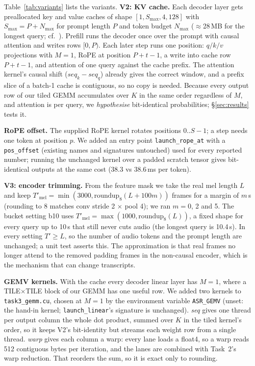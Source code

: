 \documentclass{article}
\begin{document}
Table~\ref{tab:variants} lists the variants.
\textbf{V2: KV cache.} Each decoder layer gets preallocated key and value caches of
shape $[1, S_{\max}, 4, 128]$ with $S_{\max} = P + N_{\max}$ for prompt length $P$
and token budget $N_{\max}$ ($\approx$28\,MB for the longest query;
cf.\ \citealp{kwon2023pagedattention,pope2023efficiently}). Prefill runs the decoder
once over the prompt with causal attention and writes rows $[0, P)$. Each later step
runs one position: $q/k/v$ projections with $M=1$, RoPE at position $P+t-1$, a write
into cache row $P+t-1$, and attention of one query against the cache prefix. The
attention kernel's causal shift ($\mathit{seq}_k - \mathit{seq}_q$) already gives the
correct window, and a prefix slice of a batch-1 cache is contiguous, so no copy is
needed. Because every
output row of our tiled GEMM accumulates over $K$ in the same order regardless of
$M$, and attention is per query, we \emph{hypothesise} bit-identical probabilities;
\S\ref{sec:results} tests it.

\textbf{RoPE offset.} The supplied RoPE kernel rotates positions $0..S-1$; a step needs
one token at position $p$. We added an entry point \texttt{launch\_rope\_at} with a
\texttt{pos\_offset} (existing names and signatures untouched) used for every reported number; running the unchanged kernel over a padded scratch
tensor gives bit-identical outputs at the same cost (38.3 vs 38.6\,ms per token).

\textbf{V3: encoder trimming.} From the feature mask we take the real mel length
$L$ and keep $T'_{\mathrm{mel}} = \min(3000, \mathrm{roundup}_8(L + 100m))$ frames for
a margin of $m$\,s (rounding to 8 matches conv stride 2 $\times$ pool 4); we ran
$m=0$, 2 and 5.
The bucket setting b10 uses $T'_{\mathrm{mel}} = \max(1000, \mathrm{roundup}_8(L))$,
a fixed shape for every query up to 10\,s that still never cuts audio (the longest
query is 10.4\,s). In every setting $T' \ge L$, so the number of audio tokens and the
prompt length are unchanged; a unit test asserts this. The approximation is that real
frames no longer attend to the removed padding frames in the non-causal encoder,
which is the mechanism that can change transcripts.

\textbf{GEMV kernels.} With the cache every decoder linear layer has $M=1$, where a
TILE$\times$TILE block of our GEMM has one useful row. We added two kernels to
\texttt{task3\_gemm.cu}, chosen at $M=1$ by the environment variable \texttt{ASR\_GEMV}
(unset: the hand-in kernel; \texttt{launch\_linear}'s signature is unchanged). \emph{seq}
gives one thread per output column the whole dot product, summed over $K$ in the tiled
kernel's order, so it keeps V2's bit-identity but streams each weight row from a single
thread. \emph{warp} gives each column a warp: every lane loads a float4, so a warp reads
512 contiguous bytes per iteration, and the lanes are combined with Task~2's warp
reduction. That reorders the sum, so it is exact only to rounding.
\end{document}
